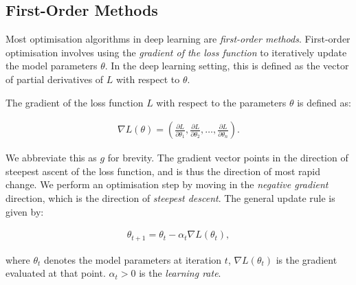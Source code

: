 
\subsection{First-Order Methods}

\label{ssec:first_order_methods}



Most optimisation algorithms in deep learning are \textit{first-order methods}. First-order optimisation involves using the \textit{gradient of the loss function} to iteratively update the model parameters $\theta$. In the deep learning setting, this is defined as the vector of partial derivatives of $L$ with respect to $\theta$.

\begin{definition}

    The gradient of the loss function $L$ with respect to the parameters $\theta$ is defined as:

    \begin{align}

        \nabla L(\theta) = \left(\frac{\partial L}{\partial \theta_1}, \frac{\partial L}{\partial \theta_2}, \ldots, \frac{\partial L}{\partial \theta_n}\right).

    \end{align}

\end{definition}



We abbreviate this as $g$ for brevity. The gradient vector points in the direction of steepest ascent of the loss function, and is thus the direction of most rapid change. We perform an optimisation step by moving in the \textit{negative gradient} direction, which is the direction of \textit{steepest descent}. The general update rule is given by:

\begin{align}

    \theta_{t+1} = \theta_t - \alpha_t \nabla L(\theta_t),

\end{align}

\label{eq:first_order_update}

where $\theta_t$ denotes the model parameters at iteration $t$, $\nabla L(\theta_t)$ is the gradient evaluated at that point. $\alpha_t > 0$ is the \textit{learning rate}. 



